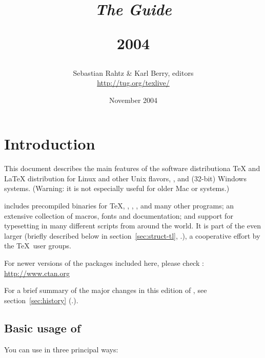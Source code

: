 \documentclass{article}
\begin{document}
\title{%
  {\huge \textit{The \protect\TL{} Guide}\\\strut}
  {\LARGE \textsf{\TK{} 2004}}
}

\author{Sebastian Rahtz \& Karl Berry, editors \\[3mm]
        \url{http://tug.org/texlive/}
       }

\date{November 2004}

\maketitle

\begin{multicols}{2}
\tableofcontents
\listoftables
\end{multicols}

\section{Introduction}
\label{sec:intro}

This document describes the main features of the \TL{} software
distribution\Dash a \TeX{} and \LaTeX{} distribution for Linux and other
Unix flavors, \MacOSX, and (32-bit) Windows systems.  (Warning: it is
not especially useful for older Mac or  systems.)

\TL{} includes precompiled binaries for \TeX{}, \LaTeXe{}, \MF, \MP,
\BibTeX{} and many other programs; an extensive collection of macros,
fonts and documentation; and support for typesetting in many different
scripts from around the world.  It is part of the even larger \TK{}
(briefly described below in section~\ref{sec:struct-tl},
\p.\pageref{sec:struct-tl}), a cooperative effort by the \TeX\ user
groups.

For newer versions of the packages included here, please check
: \url{http://www.ctan.org}

For a brief summary of the major changes in this edition of \TL{},
see section~\ref{sec:history} (\p.\pageref{sec:history}).


\subsection{Basic usage of \protect\TL{}}
\label{sec:basic}

You can use \TL{} in three principal ways:
\end{document}
